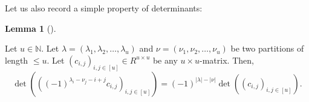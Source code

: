 \documentclass[numbers=enddot,12pt,final,onecolumn,notitlepage]{scrartcl}%
\numberwithin{exer}{section}
\theoremstyle{definition}
\newtheorem{lem}[theo]{Lemma}
\newenvironment{lemma}[1][]
{\begin{lem}[#1]\begin{leftbar}}
{\end{leftbar}\end{lem}}
\theoremstyle{plainsl}
\begin{document}
Let us also record a simple property of determinants:

\begin{lemma}
\label{lem.detscalesign}Let $u\in\mathbb{N}$. Let $\lambda=\left(  \lambda
_{1},\lambda_{2},\ldots,\lambda_{u}\right)  $ and $\nu=\left(  \nu_{1},\nu
_{2},\ldots,\nu_{u}\right)  $ be two partitions of length $\leq u$. Let
$\left(  c_{i,j}\right)  _{i,j\in\left[  u\right]  }\in R^{u\times u}$ be any
$u\times u$-matrix. Then,%
\[
\det\left(  \left(  \left(  -1\right)  ^{\lambda_{i}-\nu_{j}-i+j}%
c_{i,j}\right)  _{i,j\in\left[  u\right]  }\right)  =\left(  -1\right)
^{\left\vert \lambda\right\vert -\left\vert \nu\right\vert }\det\left(
\left(  c_{i,j}\right)  _{i,j\in\left[  u\right]  }\right)  .
\]

\end{lemma}
\end{document}
